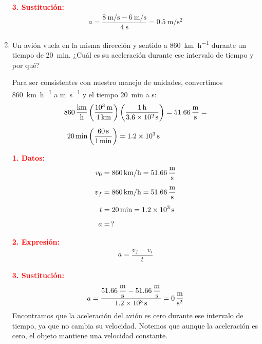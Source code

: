 \documentclass[14pt]{extarticle}
\newcommand{\textocolor}[2]{\textbf{\textcolor{#1}{#2}}}
\begin{document}
\begin{enumerate}
\textocolor{red}{3. Sustitución:}
\begin{align*}
a = \dfrac{\displaystyle \SI[per-mode=fraction]{8}{\meter\per\second} - \SI[per-mode=fraction]{6}{\meter\per\second}}{\SI{4}{\second}} = \SI[per-mode=fraction]{0.5}{\meter\per\square\second}
\end{align*}
\item  Un avión vuela en la misma dirección y sentido a \SI{860}{\kilo\meter\per\hour} durante un tiempo de \SI{20}{\minute}. ¿Cuál es su aceleración durante ese intervalo de tiempo y por qué?

Para ser consistentes con nuestro manejo de unidades, convertimos \SI{860}{\kilo\meter\per\hour} a \unit{\meter\per\second} y el tiempo \SI{20}{\minute} a \unit{\second}:
\begin{align*}
\SI[per-mode=fraction]{860}{\kilo\meter\per\hour} & \left( \dfrac{\SI{d3}{\meter}}{\SI{1}{\kilo\meter}} \right) \left( \dfrac{\SI{1}{\hour}}{\SI{3.6d2}{\second}} \right) = \SI[per-mode=fraction]{51.66}{\meter\per\second} = \\[0.5em]
\SI{20}{\minute} &\left( \dfrac{\SI{60}{\second}}{\SI{1}{\minute}} \right) = \SI{1.2d3}{\second}
\end{align*}

\begin{minipage}[t]{0.4\linewidth}
\textocolor{red}{1. Datos:}
\begin{align*}
v_{0} &= \SI{860}{\kilo\meter\per\hour} = \SI[per-mode=fraction]{51.66}{\meter\per\second} \\[0.5em]
v_{f} &= \SI{860}{\kilo\meter\per\hour} = \SI[per-mode=fraction]{51.66}{\meter\per\second} \\[0.5em]
t &= \SI{20}{\minute} = \SI{1.2d3}{\second} \\[0.5em]
a &= \, ?
\end{align*}
\end{minipage}
\hspace{1cm}
\begin{minipage}[t]{0.4\linewidth}
\textocolor{red}{2. Expresión:}
\begin{align*}
a = \dfrac{v_{f} - v_{i}}{t}
\end{align*}
\end{minipage}

\textocolor{red}{3. Sustitución:}
\begin{align*}
a = \dfrac{\displaystyle \SI[per-mode=fraction]{51.66}{\meter\per\second} - \SI[per-mode=fraction]{51.66}{\meter\per\second}}{\SI{1.2d3}{\second}} = \SI[per-mode=fraction]{0}{\meter\per\square\second}
\end{align*}
Encontramos que la aceleración del avión es cero durante ese intervalo de tiempo, ya que no cambia su velocidad. Notemos que aunque la aceleración es cero, el objeto mantiene una velocidad constante.
\end{enumerate}
\end{document}
